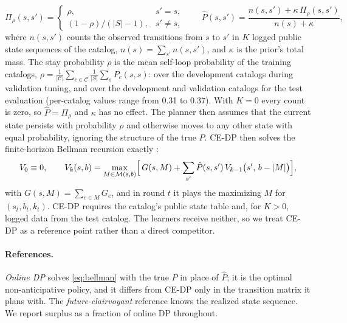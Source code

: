 \documentclass[10pt]{article}
\newcommand{\M}{\mathcal{M}}
\begin{document}
\begin{itemize}[leftmargin=*]
  \begin{equation}
    \Pi_\rho(s,s')=\begin{cases}\rho, & s'=s,\\ (1-\rho)/(|S|-1), & s'\ne s,\end{cases}
    \qquad
    \hat P(s,s')=\frac{n(s,s')+\kappa\,\Pi_\rho(s,s')}{n(s)+\kappa},
    \label{eq:cedp-prior}
  \end{equation}
  where $n(s,s')$ counts the observed transitions from $s$ to $s'$ in $K$ logged public state sequences of the catalog, $n(s)=\sum_{s'}n(s,s')$, and $\kappa$ is the prior's total mass. The stay probability $\rho$ is the mean self-loop probability of the training catalogs, $\rho=\frac{1}{|\mathcal C|}\sum_{c\in\mathcal C}\frac{1}{|S|}\sum_{s}P_c(s,s)$: \rhoDev{} over the development catalogs during validation tuning, and \rhoFull{} over the development and validation catalogs for the test evaluation (per-catalog values range from 0.31 to 0.37). With $K=0$ every count is zero, so $\hat P=\Pi_\rho$ and $\kappa$ has no effect. The planner then assumes that the current state persists with probability $\rho$ and otherwise moves to any other state with equal probability, ignoring the structure of the true $P$. CE-DP then solves the finite-horizon Bellman recursion exactly \citep{bertsekas2017dynamic}:
  \begin{equation}
    V_0\equiv 0,\qquad
    V_k(s,b)=\max_{M\in\M(s,b)}\Bigl[\,G(s,M)+\sum_{s'}\hat P(s,s')\,V_{k-1}\bigl(s',\,b-|M|\bigr)\Bigr],
    \label{eq:bellman}
  \end{equation}
  with $G(s,M)=\sum_{e\in M}G_e$, and in round $t$ it plays the maximizing $M$ for $(s_t,b_t,k_t)$. CE-DP requires the catalog's public state table and, for $K>0$, logged data from the test catalog. The learners receive neither, so we treat CE-DP as a reference point rather than a direct competitor.
\end{itemize}

\paragraph{References.} \emph{Online DP} solves \cref{eq:bellman} with the true $P$ in place of $\hat P$; it is the optimal non-anticipative policy, and it differs from CE-DP only in the transition matrix it plans with. The \emph{future-clairvoyant} reference knows the realized state sequence. We report surplus as a fraction of online DP throughout.
\end{document}
